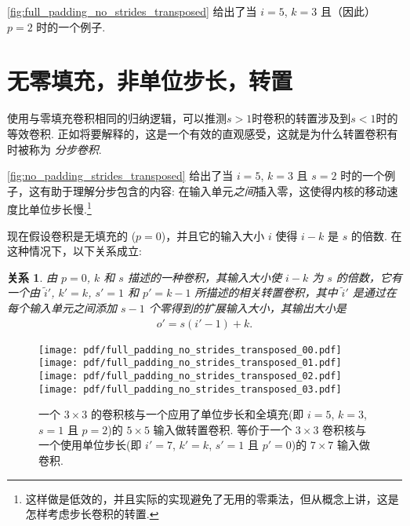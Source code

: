 \documentclass[notitlepage]{ctexrep}
\newtheorem{relationship}{关系}
\begin{document}
\autoref{fig:full_padding_no_strides_transposed} 给出了当 $i =
5$, $k = 3$ 且（因此） $p = 2$ 时的一个例子.

\section{无零填充，非单位步长，转置}

使用与零填充卷积相同的归纳逻辑，可以推测$s>1$时卷积的转置涉及到$s<1$时的等效卷积. 
正如将要解释的，这是一个有效的直观感受，这就是为什么转置卷积有时被称为 {\em
分步卷积}.

\autoref{fig:no_padding_strides_transposed} 给出了当 $i = 5$, $k
= 3$ 且 $s = 2$ 时的一个例子，这有助于理解分步包含的内容: 在输入单元{\em 之间\/}插入零，这使得内核的移动速度比单位步长慢.\footnote{这样做是低效的，并且实际的实现避免了无用的零乘法，但从概念上讲，这是怎样考虑步长卷积的转置.}

现在假设卷积是无填充的 ($p = 0$)，并且它的输入大小 $i$ 使得 $i - k$ 是 $s$ 的倍数. 在这种情况下，以下关系成立:

\begin{relationship}\label{rel:no_padding_strides_transposed}
由 $p = 0$, $k$ 和 $s$ 描述的一种卷积，其输入大小使 $i - k$ 为 $s$ 的倍数，它有一个由 $\tilde{i}'$, $k' = k$, $s' = 1$ 和 $p' = k - 1$ 所描述的相关转置卷积，其中 $\tilde{i}'$ 是通过在每个输入单元之间添加 $s - 1$ 个零得到的扩展输入大小，其输出大小是
\begin{equation*}
\begin{split}
    o' = s (i' - 1) + k.
\end{split}
\end{equation*}
\end{relationship}

\begin{figure}[p]
    \centering
    \texttt{[image: pdf/full\_padding\_no\_strides\_transposed\_00.pdf]}
    \texttt{[image: pdf/full\_padding\_no\_strides\_transposed\_01.pdf]}
    \texttt{[image: pdf/full\_padding\_no\_strides\_transposed\_02.pdf]}
    \texttt{[image: pdf/full\_padding\_no\_strides\_transposed\_03.pdf]}
    \caption{\label{fig:full_padding_no_strides_transposed} 
    一个 $3 \times 3$ 的卷积核与一个应用了单位步长和全填充(即 $i = 5$, $k = 3$, $s = 1$ 且 $p = 2$)的 $5 \times 5$ 输入做转置卷积. 等价于一个 $3 \times 3$ 卷积核与一个使用单位步长(即 $i' = 7$, $k' = k$, $s' = 1$ 且 $p' = 0$)的 $7 \times 7$ 输入做卷积.}
\end{figure}
\end{document}

